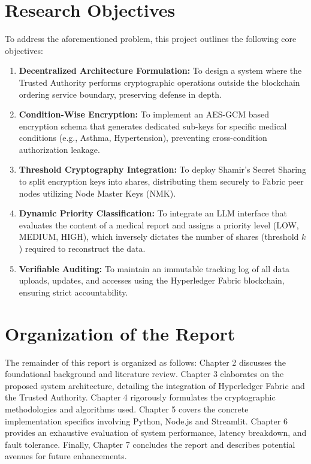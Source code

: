 \section{Research Objectives}
To address the aforementioned problem, this project outlines the following core objectives:
\begin{enumerate}
    \item \textbf{Decentralized Architecture Formulation:} To design a system where the Trusted Authority performs cryptographic operations outside the blockchain ordering service boundary, preserving defense in depth.
    \item \textbf{Condition-Wise Encryption:} To implement an AES-GCM based encryption schema that generates dedicated sub-keys for specific medical conditions (e.g., Asthma, Hypertension), preventing cross-condition authorization leakage.
    \item \textbf{Threshold Cryptography Integration:} To deploy Shamir's Secret Sharing to split encryption keys into shares, distributing them securely to Fabric peer nodes utilizing Node Master Keys (NMK).
    \item \textbf{Dynamic Priority Classification:} To integrate an LLM interface that evaluates the content of a medical report and assigns a priority level (LOW, MEDIUM, HIGH), which inversely dictates the number of shares (threshold $k$) required to reconstruct the data.
    \item \textbf{Verifiable Auditing:} To maintain an immutable tracking log of all data uploads, updates, and accesses using the Hyperledger Fabric blockchain, ensuring strict accountability.
\end{enumerate}

\section{Organization of the Report}
The remainder of this report is organized as follows: Chapter 2 discusses the foundational background and literature review. Chapter 3 elaborates on the proposed system architecture, detailing the integration of Hyperledger Fabric and the Trusted Authority. Chapter 4 rigorously formulates the cryptographic methodologies and algorithms used. Chapter 5 covers the concrete implementation specifics involving Python, Node.js and Streamlit. Chapter 6 provides an exhaustive evaluation of system performance, latency breakdown, and fault tolerance. Finally, Chapter 7 concludes the report and describes potential avenues for future enhancements.

